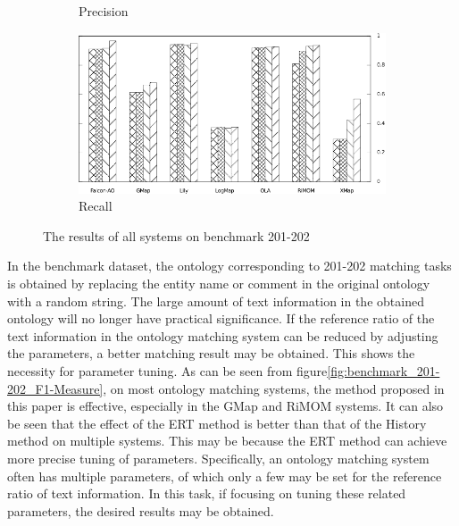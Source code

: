 \documentclass[twoside]{article}
\begin{document}
\begin{figure}[htb!]
\begin{subfigure}{0.49\textwidth}
\caption{Precision}
\label{fig:benchmark_201-202_Precision}
\end{subfigure}
\begin{subfigure}{0.49\textwidth}
	\centering
\includegraphics[width=\textwidth]{data_figs/benchmark_201-202_Recall.pdf}
\caption{Recall}
\label{fig:benchmark_201-202_Recall}
\end{subfigure}
\caption{The results of all systems on benchmark 201-202}
\end{figure}


In the benchmark dataset, the ontology corresponding to 201-202 matching tasks is obtained by replacing the entity name or comment in the original ontology with a random string. The large amount of text information in the obtained ontology will no longer have practical significance.
If the reference ratio of the text information in the ontology matching system can be reduced by adjusting the parameters, a better matching result may be obtained.
This shows the necessity for parameter tuning.
As can be seen from figure\ref{fig:benchmark_201-202_F1-Measure}, on most ontology matching systems, the method proposed in this paper is effective, especially in the GMap and RiMOM systems.
It can also be seen that the effect of the ERT method is better than that of the History method on multiple systems. This may be because the ERT method can achieve more precise tuning of parameters.
Specifically, an ontology matching system often has multiple parameters, of which only a few may be set for the reference ratio of text information.
In this task, if focusing on tuning these related parameters, the desired results may be obtained.
\end{document}

